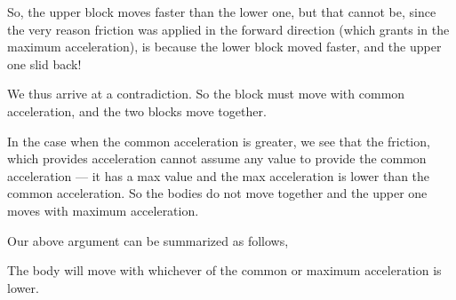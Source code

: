 So, the upper block moves faster than the lower one, but that cannot be, since the very reason 
friction was applied in the forward direction (which grants in the maximum acceleration),
is because the lower block moved faster, and the upper one slid back!

We thus arrive at a contradiction. So the block must move with common acceleration, and 
the two blocks move together.

In the case when the common acceleration is greater, we see that the friction, which provides 
acceleration cannot assume any value to provide the common acceleration --- it has a max value 
and the max acceleration is lower than the common acceleration. So the bodies do not move together 
and the upper one moves with maximum acceleration.

Our above argument can be summarized as follows,

\begin{mdframed}
    The body will move with whichever of the common or maximum acceleration is lower.
\end{mdframed}

